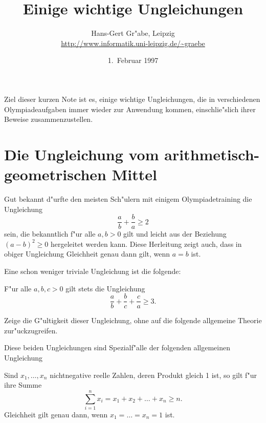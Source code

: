 \documentclass[11pt]{article}
\title{Einige wichtige Ungleichungen\kosemnetlicensemark}
\author{Hans-Gert Gr"abe, Leipzig\\[8pt]
\url{http://www.informatik.uni-leipzig.de/~graebe}}
\date{1.~Februar 1997}
\begin{document}
\maketitle

Ziel dieser kurzen Note ist es, einige wichtige Ungleichungen, die in
verschiedenen Olympiadeaufgaben immer wieder zur Anwendung kommen,
einschlie"slich ihrer Beweise zusammenzustellen.

\section{Die Ungleichung vom arithmetisch-geometrischen Mittel}

Gut bekannt d"urfte den meisten Sch"ulern mit einigem Olympiadetraining die
Ungleichung
\[\frac{a}{b}+\frac{b}{a}\geq 2\]
sein, die bekanntlich f"ur alle $a,b>0$ gilt und leicht aus der Beziehung
$(a-b)^{2}\geq 0$ hergeleitet werden kann. Diese Herleitung zeigt auch, dass
in obiger Ungleichung Gleichheit genau dann gilt, wenn $a=b$ ist.

Eine schon weniger triviale Ungleichung ist die folgende:
\begin{satz} F"ur alle $a,b,c>0$ gilt stets die Ungleichung
\[\frac{a}{b}+\frac{b}{c}+\frac{c}{a}\geq 3.\]
\end{satz}

\begin{aufgabe}
  Zeige die G"ultigkeit dieser Ungleichung, ohne auf die folgende allgemeine
  Theorie zur"uckzugreifen.
\end{aufgabe}

Diese beiden Ungleichungen sind Spezialf"alle der folgenden allgemeinen
Ungleichung
\begin{satz} Sind $x_{1},\ldots,x_{n}$ nichtnegative reelle Zahlen, deren
  Produkt gleich 1 ist, so gilt f"ur ihre Summe \[\sum_{i=1}^{n}{x_{i}} = x_{1}
  + x_{2} + \ldots + x_{n}\geq n.\]
Gleichheit gilt genau dann, wenn $x_{1}= \ldots = x_{n} =1$ ist.
\end{satz}
\end{document}
